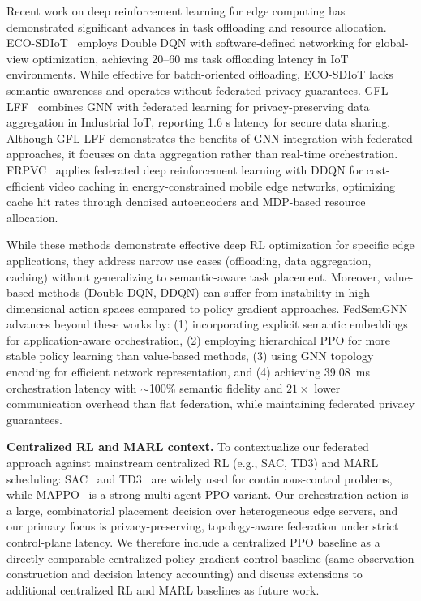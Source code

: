 \documentclass[conference]{IEEEtran}
\begin{document}
	Recent work on deep reinforcement learning for edge computing has demonstrated significant advances in task offloading and resource allocation. ECO-SDIoT~\cite{zhu2023eco} employs Double DQN with software-defined networking for global-view optimization, achieving 20--60 ms task offloading latency in IoT environments. While effective for batch-oriented offloading, ECO-SDIoT lacks semantic awareness and operates without federated privacy guarantees. GFL-LFF~\cite{regan2024gfl} combines GNN with federated learning for privacy-preserving data aggregation in Industrial IoT, reporting 1.6 s latency for secure data sharing. Although GFL-LFF demonstrates the benefits of GNN integration with federated approaches, it focuses on data aggregation rather than real-time orchestration. FRPVC~\cite{qian2025frpvc} applies federated deep reinforcement learning with DDQN for cost-efficient video caching in energy-constrained mobile edge networks, optimizing cache hit rates through denoised autoencoders and MDP-based resource allocation.
	
	While these methods demonstrate effective deep RL optimization for specific edge applications, they address narrow use cases (offloading, data aggregation, caching) without generalizing to semantic-aware task placement. Moreover, value-based methods (Double DQN, DDQN) can suffer from instability in high-dimensional action spaces compared to policy gradient approaches. FedSemGNN advances beyond these works by: (1) incorporating explicit semantic embeddings for application-aware orchestration, (2) employing hierarchical PPO for more stable policy learning than value-based methods, (3) using GNN topology encoding for efficient network representation, and (4) achieving 39.08~ms orchestration latency with $\sim$100\% semantic fidelity and $21\times$ lower communication overhead than flat federation, while maintaining federated privacy guarantees.
	
	\noindent\textbf{Centralized RL and MARL context.} To contextualize our federated approach against mainstream centralized RL (e.g., SAC, TD3) and MARL scheduling: SAC~\cite{haarnoja2018sac} and TD3~\cite{fujimoto2018td3} are widely used for continuous-control problems, while MAPPO~\cite{yu2021mappo} is a strong multi-agent PPO variant. Our orchestration action is a large, combinatorial placement decision over heterogeneous edge servers, and our primary focus is privacy-preserving, topology-aware federation under strict control-plane latency. We therefore include a centralized PPO baseline as a directly comparable centralized policy-gradient control baseline (same observation construction and decision latency accounting) and discuss extensions to additional centralized RL and MARL baselines as future work.
	
\end{document}
